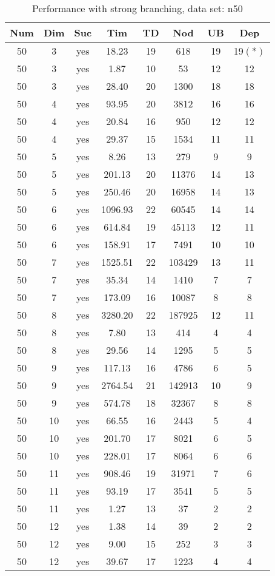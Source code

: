 \begin{table}[!htb]
  \centering
  \begin{tabular}[center]{|c|c|c|c|c|c|c|c|}
    \hline
    Num & Dim & Suc & Tim & TD & Nod & UB & Dep \\
    \hline
    50 & 3 & yes & 18.23 & 19 & 618 & 19 & 19$(*)$ \\
    50 & 3 & yes & 1.87 & 10 & 53 & 12 & 12 \\
    50 & 3 & yes & 28.40 & 20 & 1300 & 18 & 18 \\
    50 & 4 & yes & 93.95 & 20 & 3812 & 16 & 16 \\
    50 & 4 & yes & 20.84 & 16 & 950 & 12 & 12 \\
    50 & 4 & yes & 29.37 & 15 & 1534 & 11 & 11 \\
    50 & 5 & yes & 8.26 & 13 & 279 & 9 & 9 \\
    50 & 5 & yes & 201.13 & 20 & 11376 & 14 & 13 \\
    50 & 5 & yes & 250.46 & 20 & 16958 & 14 & 13 \\
    50 & 6 & yes & 1096.93 & 22 & 60545 & 14 & 14 \\
    50 & 6 & yes & 614.84 & 19 & 45113 & 12 & 11 \\
    50 & 6 & yes & 158.91 & 17 & 7491 & 10 & 10 \\
    50 & 7 & yes & 1525.51 & 22 & 103429 & 13 & 11 \\
    50 & 7 & yes & 35.34 & 14 & 1410 & 7 & 7 \\
    50 & 7 & yes & 173.09 & 16 & 10087 & 8 & 8 \\
    50 & 8 & yes & 3280.20 & 22 & 187925 & 12 & 11 \\
    50 & 8 & yes & 7.80 & 13 & 414 & 4 & 4 \\
    50 & 8 & yes & 29.56 & 14 & 1295 & 5 & 5 \\
    50 & 9 & yes & 117.13 & 16 & 4786 & 6 & 5 \\
    50 & 9 & yes & 2764.54 & 21 & 142913 & 10 & 9 \\
    50 & 9 & yes & 574.78 & 18 & 32367 & 8 & 8 \\
    50 & 10 & yes & 66.55 & 16 & 2443 & 5 & 4 \\
    50 & 10 & yes & 201.70 & 17 & 8021 & 6 & 5 \\
    50 & 10 & yes & 228.01 & 17 & 8064 & 6 & 6 \\
    50 & 11 & yes & 908.46 & 19 & 31971 & 7 & 6 \\
    50 & 11 & yes & 93.19 & 17 & 3541 & 5 & 5 \\
    50 & 11 & yes & 1.27 & 13 & 37 & 2 & 2 \\
    50 & 12 & yes & 1.38 & 14 & 39 & 2 & 2 \\
    50 & 12 & yes & 9.00 & 15 & 252 & 3 & 3 \\
    50 & 12 & yes & 39.67 & 17 & 1223 & 4 & 4 \\
    \hline
  \end{tabular}
  \caption{Performance with strong branching, data set: n50}
  \label{tab:test.bran-n50}
\end{table}

